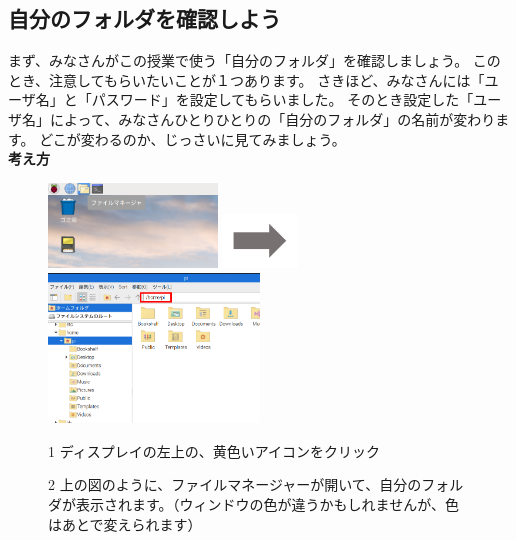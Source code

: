 \documentclass[a4paper,12pt]{jarticle}
\begin{document}
\clearpage

\subsection{\theExercise 自分のフォルダを確認しよう}
まず、みなさんがこの授業で使う「自分のフォルダ」を確認しましょう。
このとき、注意してもらいたいことが１つあります。
さきほど、みなさんには「ユーザ名」と「パスワード」を設定してもらいました。
そのとき設定した「ユーザ名」によって、みなさんひとりひとりの「自分のフォルダ」の名前が変わります。
どこが変わるのか、じっさいに見てみましょう。\\

{\bf \large 考え方}\\
\begin{figure}[ht]
\begin{minipage}{\textwidth}
  \includegraphics[width=0.4\textwidth]{textbook-img032.png}
  \includegraphics[width=2cm]{textbook-img035.png}
  \includegraphics[width=0.5\textwidth]{textbook-img1020.png}
\end{minipage}
\begin{minipage}{0.4\textwidth}
  1
  ディスプレイの左上の、黄色いアイコンをクリック
\end{minipage}
\hspace{2cm}
\vspace{20pt}
\begin{minipage}{0.5\textwidth}
  \vspace{20pt}
  2
  上の図のように、ファイルマネージャーが開いて、自分のフォルダが表示されます。（ウィンドウの色が違うかもしれませんが、色はあとで変えられます）
\end{minipage}
\end{figure}
\end{document}
